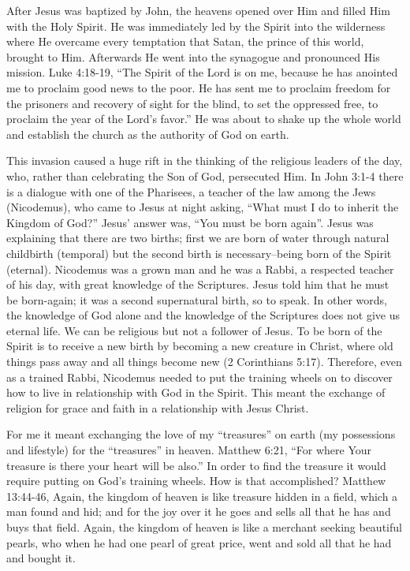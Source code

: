 \documentclass[twoside, 12pt]{book}
\begin{document}
After Jesus was baptized by John, the heavens opened over Him and filled Him with the Holy Spirit. He was immediately led by the Spirit into the wilderness where He overcame every temptation that Satan, the prince of this world, brought to Him. Afterwards He went into the synagogue and pronounced His mission. Luke 4:18-19, “The Spirit of the Lord is on me, because he has anointed me to proclaim good news to the poor. He has sent me to proclaim freedom for the prisoners and recovery of sight for the blind, to set the oppressed free, to proclaim the year of the Lord’s favor.” He was about to shake up the whole world and establish the church as the authority of God on earth. 

This invasion caused a huge rift in the thinking of the religious leaders of the day, who, rather than celebrating the Son of God, persecuted Him. In John 3:1-4 there is a dialogue with one of the Pharisees, a teacher of the law among the Jews (Nicodemus), who came to Jesus at night asking, “What must I do to inherit the Kingdom of God?” Jesus' answer was, “You must be born again”. Jesus was explaining that there are two births; first we are born of water through natural childbirth (temporal) but the second birth is necessary--being born of the Spirit (eternal). Nicodemus was a grown man and he was a Rabbi, a respected teacher of his day, with great knowledge of the Scriptures. Jesus told him that he must be born-again; it was a second supernatural birth, so to speak. In other words, the knowledge of God alone and the knowledge of the Scriptures does not give us eternal life. We can be religious but not a follower of Jesus. To be born of the Spirit is to receive a new birth by becoming a new creature in Christ, where old things pass away and all things become new (2 Corinthians 5:17). Therefore, even as a trained Rabbi, Nicodemus needed to put the training wheels on to discover how to live in relationship with God in the Spirit. This meant the exchange of religion for grace and faith in a relationship with Jesus Christ. 

For me it meant exchanging the love of my “treasures” on earth (my possessions and lifestyle) for the “treasures” in heaven. Matthew 6:21,  “For where Your treasure is there your heart will be also.” In order to find the treasure it would require putting on God’s training wheels. How is that accomplished? Matthew 13:44-46, Again, the kingdom of heaven is like treasure hidden in a field, which a man found and hid; and for the joy over it he goes and sells all that he has and buys that field. Again, the kingdom of heaven is like a merchant seeking beautiful pearls, who when he had one pearl of great price, went and sold all that he had and bought it.
\end{document}
